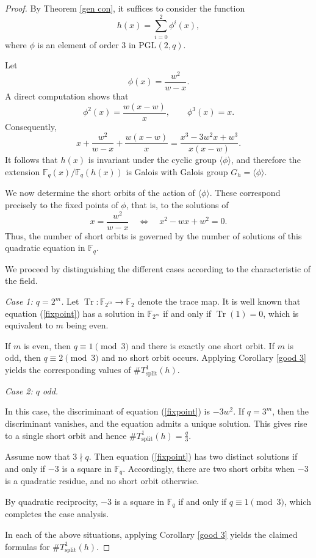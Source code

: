 \documentclass[1p,final]{elsarticle}
\newtheorem{open problem}[theorem]{Open Problem}
\begin{document}
\begin{proof}

By Theorem \ref{gen con}, it suffices to consider the function
\[
h(x)=\sum_{i=0}^{2}\phi^{i}(x),
\]
where $\phi$ is an element of order $3$ in $\mathrm{PGL}(2,q)$.

Let
\[
\phi(x)=\frac{w^2}{w-x}.
\]
A direct computation shows that
\[
\phi^2(x)=\frac{w(x-w)}{x}, \qquad \phi^3(x)=x.
\]
Consequently,
\[
x+\frac{w^2}{w-x}+\frac{w(x-w)}{x}
=
\frac{x^3-3w^2x+w^3}{x(x-w)}.
\]
It follows that $h(x)$ is invariant under the cyclic group $\langle \phi \rangle$, and therefore the extension $\mathbb{F}_{q}(x)/\mathbb{F}_{q}(h(x))$ is Galois with Galois group $G_h=\langle \phi \rangle$.

\medskip

We now determine the short orbits of the action of $\langle \phi \rangle$. These correspond precisely to the fixed points of $\phi$, that is, to the solutions of
\begin{equation}\label{fixpoint}
x = \frac{w^2}{w-x} \quad \Longleftrightarrow \quad x^2 - wx + w^2 = 0.
\end{equation}
Thus, the number of short orbits is governed by the number of solutions of this quadratic equation in $\mathbb{F}_q$.

\medskip

We proceed by distinguishing the different cases according to the characteristic of the field.

\smallskip

\emph{Case 1: $q=2^m$.}  
Let $\operatorname{Tr}: \mathbb{F}_{2^m}\to\mathbb{F}_2$ denote the trace map. It is well known that equation (\ref{fixpoint}) has a solution in $\mathbb{F}_{2^m}$ if and only if $\operatorname{Tr}(1)=0$, which is equivalent to $m$ being even.

If $m$ is even, then $q\equiv 1 \pmod{3}$ and there is exactly one short orbit. If $m$ is odd, then $q\equiv 2 \pmod{3}$ and no short orbit occurs. Applying Corollary \ref{good 3} yields the corresponding values of $\#T_{\text{split}}^1(h)$.

\medskip

\emph{Case 2: $q$ odd.}

In this case, the discriminant of equation (\ref{fixpoint}) is $-3w^2$. If $q=3^m$, then the discriminant vanishes, and the equation admits a unique solution. This gives rise to a single short orbit and hence $\#T_{\text{split}}^1(h)=\frac{q}{3}$.

Assume now that $3\nmid q$. Then equation (\ref{fixpoint}) has two distinct solutions if and only if $-3$ is a square in $\mathbb{F}_q$. Accordingly, there are two short orbits when $-3$ is a quadratic residue, and no short orbit otherwise.

By quadratic reciprocity, $-3$ is a square in $\mathbb{F}_q$ if and only if $q\equiv 1 \pmod{3}$, which completes the case analysis.

\medskip

In each of the above situations, applying Corollary \ref{good 3} yields the claimed formulas for $\#T_{\text{split}}^1(h)$.

\end{proof}
\end{document}

